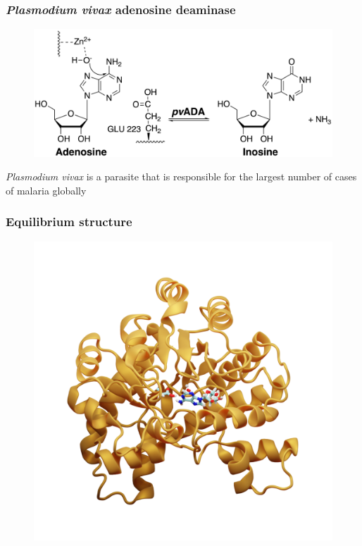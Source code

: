 \documentclass{beamer}
\begin{document}
\begin{frame}
\frametitle{\textit{Plasmodium vivax} adenosine deaminase}
\begin{figure}
\includegraphics[scale=0.6]{figures/ada-reaction.png}
\end{figure}
\textit{Plasmodium vivax} is a parasite that is responsible for the largest number of cases of
malaria globally
\end{frame}
\begin{frame}
\frametitle{Equilibrium structure}
\begin{figure}
\includegraphics[scale=0.23]{figures/ada-equil.png}
\end{figure}
\end{frame}
\end{document}
